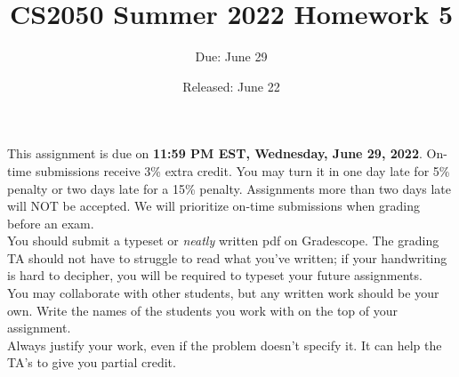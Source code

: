 \documentclass{article}
\title{CS2050 Summer 2022 Homework 5}
\author{Due: June 29}
\date{Released: June 22}
\begin{document}
\maketitle

This assignment is due on \textbf{11:59 PM EST, Wednesday, June 29, 2022}.  On-time submissions receive 3\% extra credit. You may turn it in one day late for 5\% penalty or two days late for a 15\% penalty. Assignments more than two days late will NOT be accepted.  We will prioritize on-time submissions when grading before an exam. \\ 

You should submit a typeset or \emph{neatly} written pdf on Gradescope.  The grading TA should not have to struggle to read what you've written; if your handwriting is hard to decipher, you will be required to typeset your future assignments.\\ 

You may collaborate with other students, but any written work should be your own. Write the names of the students you work with on the top of your assignment.\\

Always justify your work, even if the problem doesn't specify it. It can help the TA's to give you partial credit.
\end{document}
